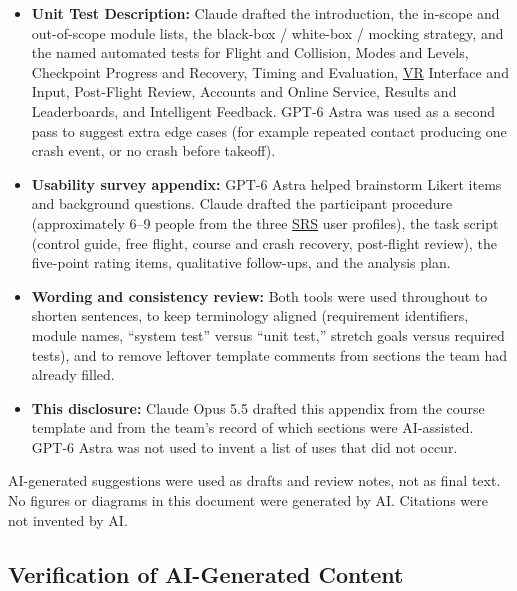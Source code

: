 \documentclass[12pt, titlepage]{article}
\begin{document}
\begin{enumerate}
\begin{itemize}
        \item \textbf{Unit Test Description:} Claude drafted the
        introduction, the in-scope and out-of-scope module lists, the
        black-box / white-box / mocking strategy, and the named automated
        tests for Flight and Collision, Modes and Levels, Checkpoint
        Progress and Recovery, Timing and Evaluation, \hyperlink{abbr:VR}{VR} Interface and
        Input, Post-Flight Review, Accounts and Online Service, Results
        and Leaderboards, and Intelligent Feedback. GPT-6 Astra was used
        as a second pass to suggest extra edge cases (for example repeated
        contact producing one crash event, or no crash before takeoff).

        \item \textbf{Usability survey appendix:} GPT-6 Astra helped
        brainstorm Likert items and background questions. Claude drafted
        the participant procedure (approximately 6--9 people from the
        three \hyperlink{abbr:SRS}{SRS} user profiles), the task script (control guide, free
        flight, course and crash recovery, post-flight review), the
        five-point rating items, qualitative follow-ups, and the analysis
        plan. 

        \item \textbf{Wording and consistency review:} Both tools were
        used throughout to shorten sentences, to keep terminology aligned
        (requirement identifiers, module names, ``system test'' versus
        ``unit test,'' stretch goals versus required tests), and to remove
        leftover template comments from sections the team had already
        filled.

        \item \textbf{This disclosure:} Claude Opus 5.5 drafted this
        appendix from the course template and from the team's record of
        which sections were AI-assisted. GPT-6 Astra was not used to
        invent a list of uses that did not occur.
    \end{itemize}

    AI-generated suggestions were used as drafts and review notes, not as
    final text. No figures or diagrams in this document were generated by
    AI. Citations were not invented by AI.
\end{enumerate}

\subsection{Verification of AI-Generated Content}
\end{document}

